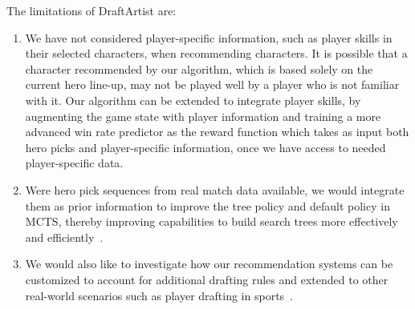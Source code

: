 The limitations of DraftArtist are: 
\begin{enumerate}
\item We have not considered player-specific information, such as player skills in their selected characters, when recommending characters. It is possible that a character recommended by our algorithm, which is based solely on the current hero line-up, may not be played well by a player who is not familiar with it. Our algorithm can be extended to integrate player skills, by augmenting the game state with player information and training a more advanced win rate predictor as the reward function which takes as input both hero picks and player-specific information, once we have access to needed player-specific data.

\item Were hero pick sequences from real match data available, we would integrate them as prior information to improve the tree policy and default policy in MCTS, thereby improving capabilities to build search trees more effectively and efficiently~\citep{gelly2007combining,chaslot2009adding}. 
\item We would also like to investigate how our recommendation systems can be customized to account for additional drafting rules and extended to other real-world scenarios such as player drafting in sports~\citep{staw1995sunk}. 

\end{enumerate}

